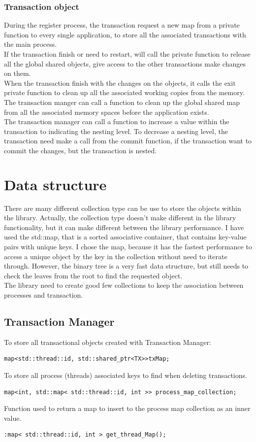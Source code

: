 \documentclass[12pt]{article}
\begin{document}
\subsubsection{Transaction object}
During the register process, the transaction request a new map from a private function to every single application, to store all the associated transactions with the main process.\\
If the transaction finish or need to restart, will call the private function to release all the global shared objects, give access to the other transactions make changes on them.\\ 
When the transaction finish with the changes on the objects, it calls the exit private function to clean up all the associated working copies from the memory.\\
The transaction manger can  call a function to clean up the global shared map from all the associated memory spaces before the application exists.\\
The transaction manager can call a function to increase a value within the transaction to indicating the nesting level. To decrease a nesting level, the transaction need make a call from the commit function, if the transaction want to commit the changes, but the transaction is nested.

\section{Data structure}
There are many different collection type can be use to store the objects within the library. Actually, the collection type doesn't make different in the library functionality, but it can make different between the library performance. I have used the std::map, that is a sorted associative container, that contains key-value pairs with unique keys. I chose the map, because it has the fastest performance to access a unique object by the key in the collection without need to iterate through. However, the binary tree is a very fast data structure, but still needs to check the leaves from the root to find the requested object.\\

The library need to create good few collections to keep the association between processes and transaction.
\subsection{Transaction Manager}
To store all transactional objects created with Transaction Manager:
\begin{lstlisting}
map<std::thread::id, std::shared_ptr<TX>>txMap;
\end{lstlisting}
To store all process (threads) associated keys to find when deleting transactions. 
\begin{lstlisting}
map<int, std::map< std::thread::id, int >> process_map_collection;
\end{lstlisting}
Function used to return a map to insert to the process map collection as an inner value.
\begin{lstlisting}
:map< std::thread::id, int > get_thread_Map();
\end{lstlisting}
\end{document}
